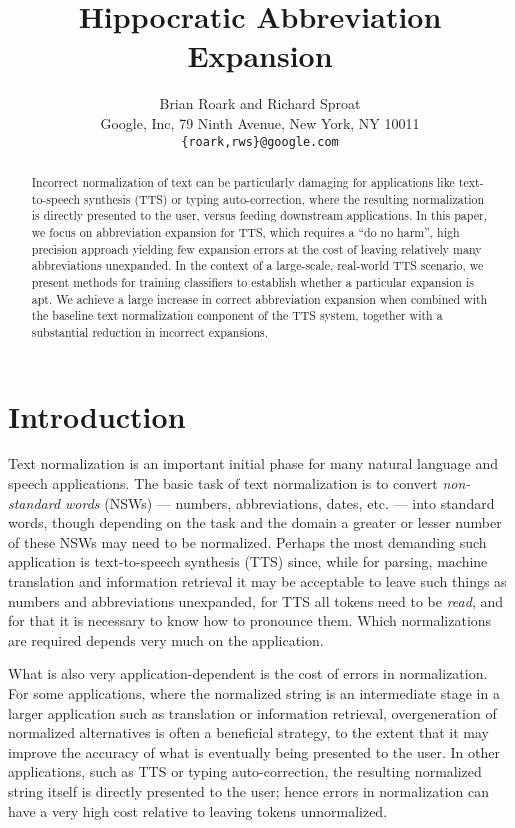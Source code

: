 \documentclass[11pt]{article}
\title{Hippocratic Abbreviation Expansion}
\author{Brian Roark and Richard Sproat\\
Google, Inc, 79 Ninth Avenue, New York, NY 10011\\
 {\tt \{roark,rws\}@google.com}}
\date{}
\begin{document}
\maketitle
\begin{abstract}
  Incorrect normalization of text can be particularly damaging for applications
  like text-to-speech synthesis (TTS) or typing auto-correction, where the
  resulting normalization is directly presented to the user, versus feeding
  downstream applications.  In this paper, we focus on abbreviation expansion
  for TTS, which requires a ``do no harm'', high precision approach yielding few
  expansion errors at the cost of leaving relatively many abbreviations
  unexpanded. In the context of a large-scale, real-world TTS scenario, we
  present methods for training classifiers to establish whether a particular
  expansion is apt.  We achieve a large increase in correct abbreviation
  expansion when combined with the baseline text normalization component of the
  TTS system, together with a substantial reduction in incorrect expansions.
\end{abstract}

\vspace{-0.2cm}
\section{Introduction}
\label{sec:intro}

Text normalization \cite{Sproat:EtAl:01} is an important initial phase for many
natural language and speech applications. The basic task of text normalization
is to convert \emph{non-standard words} (NSWs) --- numbers, abbreviations,
dates, etc. --- into standard words, though depending on the task and the domain
a greater or lesser number of these NSWs may need to be normalized.  Perhaps the
most demanding such application is text-to-speech synthesis (TTS) since, while
for parsing, machine translation and information retrieval it may be acceptable
to leave such things as numbers and abbreviations unexpanded, for TTS all tokens
need to be \emph{read}, and for that it is necessary to know how to pronounce
them.  Which normalizations are required depends very much on the application.

What is also very application-dependent is the cost of errors in normalization.
For some applications, where the normalized string is an intermediate stage in a
larger application such as translation or information retrieval, overgeneration
of normalized alternatives is often a beneficial strategy, to the extent that it
may improve the accuracy of what is eventually being presented to the user.  In
other applications, such as TTS or typing auto-correction, the resulting
normalized string itself is directly presented to the user; hence errors in
normalization can have a very high cost relative to leaving tokens unnormalized.
\end{document}
